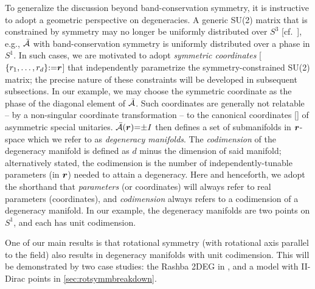 \documentclass[aps, prb, showpacs, twocolumn, notitlepage, superscriptaddress]{revtex4-1}
\begin{document}
To generalize the discussion beyond band-conservation symmetry, it is instructive to adopt a geometric perspective on degeneracies. A generic SU(2) matrix that is constrained by symmetry may no longer be uniformly distributed over $S^3$ [cf.\ ], e.g., ${\cal \bar{A}}$ with band-conservation symmetry is uniformly distributed over a phase in $S^1$. In such cases, we are  motivated to adopt \textit{symmetric coordinates} [$\{r_1,\ldots,r_{d}\}{:}{=}\boldsymbol{r}$] that independently parametrize the symmetry-constrained SU(2) matrix; the precise nature of these constraints will be developed in subsequent subsections.
In our example, we may choose the symmetric coordinate as the phase of the diagonal element of ${\cal \bar{A}}$. Such coordinates are generally not relatable -- by a non-singular coordinate transformation -- to the canonical coordinates [] of asymmetric special unitaries. ${\cal \bar{A}}(\boldsymbol{r}){=}{\pm}I$ then defines a set of submanifolds in $\boldsymbol{r}$-space which we refer to as \textit{degeneracy manifolds}. The \textit{codimension} of the degeneracy manifold  is defined as $d$ minus the dimension of said manifold; alternatively stated, the codimension is the number of independently-tunable parameters (in $\boldsymbol{r}$) needed to attain a degeneracy. Here and henceforth, we adopt the shorthand that  \textit{parameters} (or coordinates) will always refer to real parameters (coordinates), and \textit{codimension} always refers to a codimension of a degeneracy manifold. In our example, the degeneracy manifolds  are two points on $S^1$, and each has unit codimension. 
 
One of our main results is that rotational symmetry (with rotational axis parallel to the field) also results in degeneracy manifolds with unit codimension. This will be demonstrated by two  case studies: the Rashba 2DEG in , and a model with II-Dirac points in \ref{sec:rotsymmbreakdown}. 
 


\end{document}
